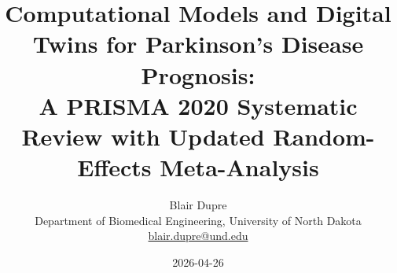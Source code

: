 \documentclass[11pt,letterpaper]{article}
\title{\textbf{Computational Models and Digital Twins for Parkinson's Disease Prognosis: \\
A PRISMA 2020 Systematic Review with Updated Random-Effects Meta-Analysis}}
\author{Blair Dupre\\
Department of Biomedical Engineering, University of North Dakota \\
\href{mailto:blair.dupre@und.edu}{blair.dupre@und.edu}}
\date{2026-04-26}
\begin{document}
\maketitle

\tableofcontents
\listoffigures
\listoftables

\newpage



\hypertarget{ch:p7}{}\label{ch:p7}


\end{document}
